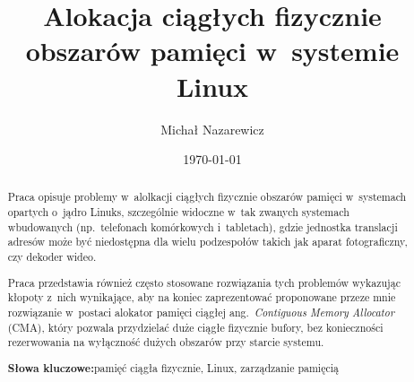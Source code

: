 \documentclass[runningheads,a4paper,twoside]{llncs}
\title{Alokacja ciągłych fizycznie obszarów pamięci w~systemie Linux}
\author{Michał Nazarewicz}
\date{\today}
\institute{Instytut Informatyki Politechniki Warszawskiej,\\
\href{mailto:mina86@mina86.com}{\path|mina86@mina86.com|}}
\newcommand*{\ang}[1]{ang.\ {\it #1}}
\newcommand{\keywords}[1]{\par\addvspace\baselineskip
\noindent\textbf{Słowa kluczowe:}\enspace\ignorespaces#1}
\begin{document}

\mainmatter

\maketitle

\begin{abstract}
Praca opisuje problemy w~alolkacji ciągłych fizycznie obszarów pamięci
w~systemach opartych o~jądro Linuks, szczególnie widoczne w~tak
zwanych systemach wbudowanych (np.\ telefonach komórkowych
i~tabletach), gdzie jednostka translacji adresów może być niedostępna
dla wielu podzespołów takich jak aparat fotograficzny, czy dekoder
wideo.

Praca przedstawia również często stosowane rozwiązania tych problemów
wykazując kłopoty z~nich wynikające, aby na koniec zaprezentować
proponowane przeze mnie rozwiązanie w~postaci alokator pamięci ciągłej
\ang{Contiguous Memory Allocator} (CMA), który pozwala przydzielać
duże ciągłe fizycznie bufory, bez konieczności rezerwowania na
wyłączność dużych obszarów przy starcie systemu.

\keywords{pamięć ciągła fizycznie, Linux, zarządzanie pamięcią}
\end{abstract}






\appendix
\printbibliography
\end{document}
